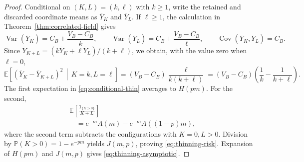 \documentclass[10pt,a4paper]{amsart}
\DeclareMathOperator{\Cov}{Cov}
\DeclareMathOperator{\Var}{Var}
\newcommand{\EE}{\mathbb E}
\newcommand{\PP}{\mathbb P}
\begin{document}
\begin{proof}
Conditional on \((K,L)=(k,\ell)\) with \(k\ge1\), write the retained and discarded coordinate means as \(\overline Y_K\) and \(\overline Y_L\).  If \(\ell\ge1\), the calculation in Theorem~\ref{thm:correlated-field} gives
\[
 \Var(\overline Y_K)=C_B+\frac{V_B-C_B}{k},\qquad
 \Var(\overline Y_L)=C_B+\frac{V_B-C_B}{\ell},\qquad
 \Cov(\overline Y_K,\overline Y_L)=C_B.
\]
Since
\(
 \overline Y_{K+L}=(k\overline Y_K+\ell\overline Y_L)/(k+\ell)
\), we obtain, with the value zero when \(\ell=0\),
\begin{equation}
\label{eq:conditional-thin}
 \EE\!\left[(\overline Y_K-\overline Y_{K+L})^2\,\middle|\,K=k,L=\ell\right]
 =(V_B-C_B)\frac{\ell}{k(k+\ell)}
 =(V_B-C_B)\left(\frac1k-\frac1{k+\ell}\right).
\end{equation}
The first expectation in \eqref{eq:conditional-thin} averages to \(H(pm)\).  For the second,
\begin{align*}
 &\EE\!\left[\frac{\mathbf1_{\{K>0\}}}{K+L}\right]\\
 &\quad=e^{-m}A(m)-e^{-m}A((1-p)m),
\end{align*}
where the second term subtracts the configurations with \(K=0,L>0\).  Division by \(\PP(K>0)=1-e^{-pm}\) yields \(J(m,p)\), proving \eqref{eq:thinning-risk}.  Expansion of \(H(pm)\) and \(J(m,p)\) gives \eqref{eq:thinning-asymptotic}.
\end{proof}
\end{document}
